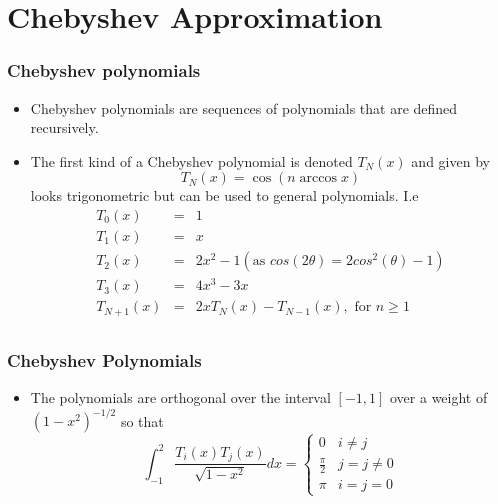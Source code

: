 \documentclass[10pt]{beamer}
\begin{document}
\section{Chebyshev Approximation}

\begin{frame}
  \frametitle{Chebyshev polynomials}
  \begin{itemize}
  \item Chebyshev polynomials are sequences of polynomials that are defined recursively.
  \item The first kind of a Chebyshev polynomial is denoted $T_N(x)$ and given by
    \[
      T_N(x) = \cos( n \arccos x)
    \]
    looks trigonometric but can be used to general polynomials. I.e
    \[
      \begin{array}{rcl}
        T_0(x)     & = & 1\\
        T_1(x)     & = & x\\
        T_2(x)     & = & 2 x^2 - 1 (\mbox{as } cos(2\theta) = 2cos^2(\theta) -1) \\
        T_3(x)     & = & 4 x^3 - 3 x \\
        T_{N+1}(x)  & = & 2 x T_N(x) - T_{N-1}(x), \mbox{ for } n \geq 1\\
      \end{array}
    \]
  \end{itemize}
\end{frame}

\begin{frame}
  \frametitle{Chebyshev Polynomials}
  \begin{itemize}
  \item The polynomials are orthogonal over the interval $[-1,1]$ over a weight of $(1-x^2)^{-1/2}$ so that
    \[
      \int_{-1}^2 \frac{T_i(x) T_j(x)}{\sqrt{1-x^2}} dx = \left\{
        \begin{array}{ll}
          0& i \neq j\\
          \frac{\pi}{2} & j = j \neq 0\\
          \pi & i = j = 0
        \end{array}\right.
    \]
  \end{itemize}
\end{frame}
\end{document}

